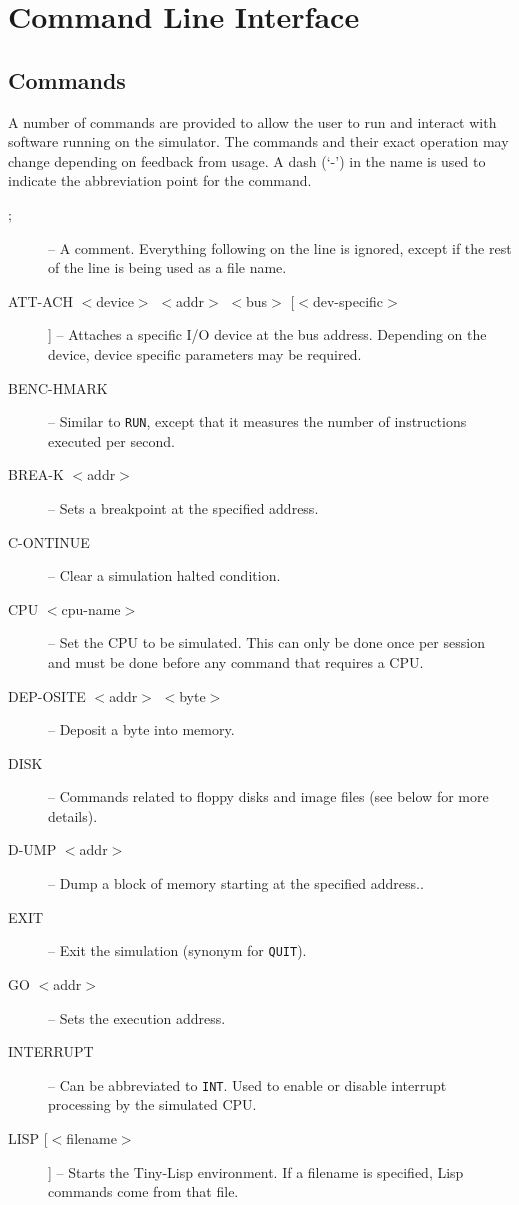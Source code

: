 \documentclass[10pt, openany]{book}
\begin{document}
\chapter{Command Line Interface}
\section{Commands}
A number of commands are provided to allow the user to run and interact with software running on the simulator.
The commands and their exact operation may change depending on feedback from usage.
A dash (`-') in the name is used to indicate the abbreviation point for the command.
\begin{description}
  \item[;] -- A comment.  Everything following on the line is ignored, except if the rest of the line is being used as a file name.
  \item[ATT-ACH $<$device$>$ $<$addr$>$ $<$bus$>$ [$<$dev-specific$>$]] --  Attaches a specific I/O device at the bus address.  Depending on the device, device specific parameters may be required.
  \item[BENC-HMARK] --  Similar to \verb|RUN|, except that it measures the number of instructions executed per second.
  \item[BREA-K $<$addr$>$] -- Sets a breakpoint at the specified address.
  \item[C-ONTINUE] -- Clear a simulation halted condition.
  \item[CPU $<$cpu-name$>$] -- Set the CPU to be simulated.  This can only be done once per session and must be done before any command that requires a CPU.
  \item[DEP-OSITE $<$addr$>$ $<$byte$>$] -- Deposit a byte into memory.
  \item[DISK]  --  Commands related to floppy disks and image files (see below for more details).
  \item[D-UMP $<$addr$>$] -- Dump a block of memory starting at the specified address..
  \item[EXIT] -- Exit the simulation (synonym for \verb|QUIT|).
  \item[GO $<$addr$>$] -- Sets the execution address.
  \item[INTERRUPT]-- Can be abbreviated to \verb|INT|.  Used to enable or disable interrupt processing by the simulated CPU.
  \item[LISP [$<$filename$>$]] -- Starts the Tiny-Lisp environment.  If a filename is specified, Lisp commands come from that file.

\end{description}
\end{document}
